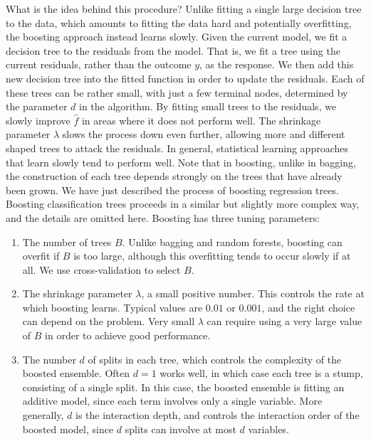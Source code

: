 What is the idea behind this procedure? Unlike fitting a single large decision tree to the data, which amounts to fitting the data hard and potentially overfitting, the boosting approach instead learns slowly. Given the current model, we fit a decision tree to the residuals from the model. That is, we fit a tree using the current residuals, rather than the outcome $y$, as the response. We then add this new decision tree into the fitted function in order to update the residuals. Each of these trees can be rather small, with just a few terminal nodes, determined by the parameter $d$ in the algorithm. By fitting small trees to the residuals, we slowly improve $\hat{f}$ in areas where it does not perform well. The shrinkage parameter $\lambda$ slows the process down even further, allowing more and different shaped trees to attack the residuals. In general, statistical learning approaches that learn slowly tend to perform well. Note that in boosting, unlike in bagging, the construction of each tree depends strongly on the trees that have already been grown. We have just described the process of boosting regression trees. Boosting classification trees proceeds in a similar but slightly more complex way, and the details are omitted here. Boosting has three tuning parameters:

\begin{enumerate}
    \item The number of trees $B$. Unlike bagging and random forests, boosting can overfit if $B$ is too large, although this overfitting tends to occur slowly if at all. We use cross-validation to select $B$.
    \item The shrinkage parameter $\lambda$, a small positive number. This controls the rate at which boosting learns. Typical values are $0.01$ or $0.001$, and the right choice can depend on the problem. Very small $\lambda$ can require using a very large value of $B$ in order to achieve good performance.
    \item The number $d$ of splits in each tree, which controls the complexity of the boosted ensemble. Often $d=1$ works well, in which case each tree is a stump, consisting of a single split. In this case, the boosted ensemble is fitting an additive model, since each term involves only a single variable. More generally, $d$ is the interaction depth, and controls the interaction order of the boosted model, since $d$ splits can involve at most $d$ variables.
\end{enumerate}
